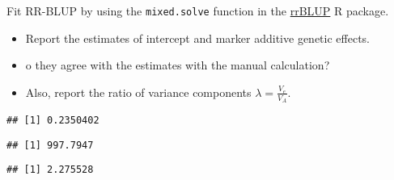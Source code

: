 \documentclass[
]{article}
\newenvironment{Shaded}{\begin{snugshade}}{\end{snugshade}}
\newcommand{\AttributeTok}[1]{\textcolor[rgb]{0.13,0.29,0.53}{#1}}
\newcommand{\CommentTok}[1]{\textcolor[rgb]{0.56,0.35,0.01}{\textit{#1}}}
\newcommand{\FunctionTok}[1]{\textcolor[rgb]{0.13,0.29,0.53}{\textbf{#1}}}
\newcommand{\NormalTok}[1]{#1}
\newcommand{\OtherTok}[1]{\textcolor[rgb]{0.56,0.35,0.01}{#1}}
\newcommand{\SpecialCharTok}[1]{\textcolor[rgb]{0.81,0.36,0.00}{\textbf{#1}}}
\providecommand{\tightlist}{%
  \setlength{\itemsep}{0pt}\setlength{\parskip}{0pt}}
\begin{document}
Fit RR-BLUP by using the \texttt{mixed.solve} function in the
\href{https://cran.r-project.org/web/packages/rrBLUP/index.html}{rrBLUP}
R package.

\begin{itemize}
\tightlist
\item
  Report the estimates of intercept and marker additive genetic effects.
\item
  o they agree with the estimates with the manual calculation?
\item
  Also, report the ratio of variance components
  \(\lambda = \frac{V_e}{V_A}\).
\end{itemize}

\begin{Shaded}
\end{Shaded}

\begin{verbatim}
## [1] 0.2350402
\end{verbatim}

\begin{Shaded}
\end{Shaded}

\begin{verbatim}
## [1] 997.7947
\end{verbatim}

\begin{Shaded}
\end{Shaded}

\begin{verbatim}
## [1] 2.275528
\end{verbatim}

\begin{Shaded}
\end{Shaded}
\end{document}
